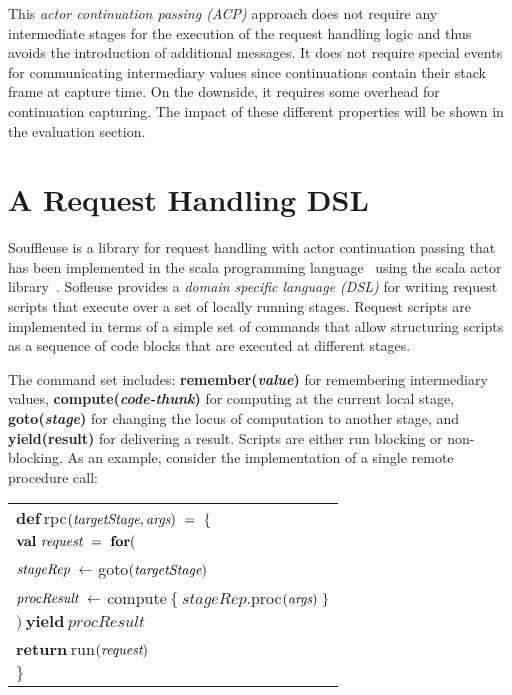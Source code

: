 \documentclass{sig-alternate}
\begin{document}
This \emph{actor continuation passing (ACP)} approach does not require any intermediate stages for
the execution of the request handling logic and thus avoids the introduction of additional messages.
It does not require special events for communicating intermediary values since continuations contain
their stack frame at capture time. On the downside, it requires some overhead for continuation
capturing. The impact of these different properties will be shown in the evaluation section.


\section{A Request Handling DSL}

Souffleuse is a library for request handling with actor continuation passing that has been
implemented in the scala programming language~\cite{Odersky:2004} using the scala actor
library~\cite{Haller:2007}. Sofleuse provides a \emph{domain specific language (DSL)} for writing
request scripts that execute over a set of locally running stages. Request scripts are implemented
in terms of a simple set of commands that allow structuring scripts as a sequence of code blocks
that are executed at different stages.

The command set includes: \textbf{remember(\emph{value})} for remembering intermediary values,
\textbf{compute(\emph{code-thunk})} for computing at the current local stage, \textbf{goto(\emph{stage})}
for changing the locus of computation to another stage, and \textbf{yield(result)} for delivering a
result. Scripts are either run blocking or non-blocking. As an example, consider the implementation
of a single remote procedure call:
                    
\medskip   
{\footnotesize\begin{tabular}{l}           
$\textbf{def}\ $rpc$(\emph{targetStage}, \emph{args})\ =\ \{$\\	
\hspace{2ex} $\textbf{val}\ \emph{request}\ =\ \textbf{for} ($\\
\hspace{6ex} $\emph{stageRep}\ \leftarrow\ $goto$(\emph{targetStage})$\\
\hspace{6ex} $\emph{procResult}\ \leftarrow\ $compute$\ \{\ stageRep.$proc$(\emph{args})\ \}$\\
\hspace{2ex} $)\ \textbf{yield}\ procResult$\\
\hspace{2ex} $\textbf{return}\ $run$(\emph{request})$\\   
$\}$\\
\end{tabular}}
\medskip
\end{document}
